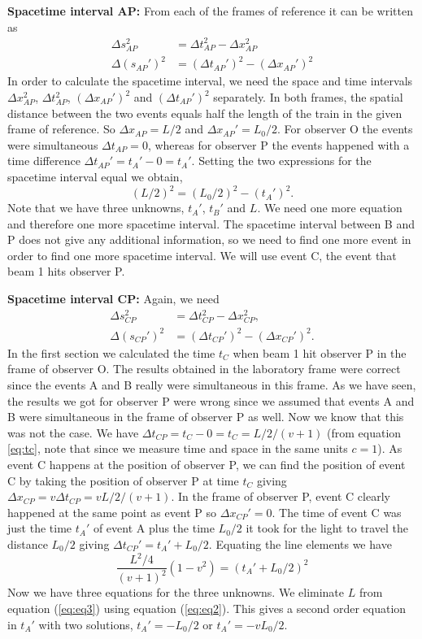 {\begin{multicols}{2}
{\bf Spacetime interval AP:}
From each of the frames of reference it can be written as
\begin{align*}
\Delta s_{AP}^2&=\Delta t_{AP}^2-\Delta x_{AP}^2\\
\Delta (s_{AP}')^2&=(\Delta t_{AP}')^2-(\Delta x_{AP}')^2
\end{align*}
In order to calculate the spacetime interval, we need the space and time intervals $\Delta x_{AP}^2$, $\Delta t_{AP}^2$, $(\Delta x_{AP}')^2$ and $(\Delta t_{AP}')^2$ separately. In both frames, the spatial distance between the two events equals half the length of the train in the given frame of reference. So $\Delta x_{AP}=L/2$ and $\Delta x_{AP}'=L_0/2$. For observer O the events were simultaneous $\Delta t_{AP}=0$, whereas for observer P the events happened with a time difference $\Delta t_{AP}'=t_A'-0=t_A'$. Setting the two expressions for the spacetime interval equal we obtain,
\begin{equation}
\label{eq:eq2}
(L/2)^2=(L_0/2)^2-(t_A')^2.
\end{equation}
Note that we have three unknowns, $t_A'$, $t_B'$ and $L$. We need one more equation and therefore one more spacetime interval. The spacetime interval between B and P does not give any additional information, so we need to find one more event in order to find one more spacetime interval. We will use event C, the event that beam 1 hits observer P.


{\bf Spacetime interval CP:}
Again, we need
\begin{align*}
\Delta s_{CP}^2&=\Delta t_{CP}^2-\Delta x_{CP}^2,\\
\Delta (s_{CP}')^2&=(\Delta t_{CP}')^2-(\Delta x_{CP}')^2.
\end{align*}
In the first section we calculated the time $t_C$  when beam 1 hit observer P in the frame of observer O. The results obtained in the laboratory frame were correct since the events A and B really were simultaneous in this frame. As we have seen, the results we got for observer P were wrong since we assumed that events A and B were simultaneous in the frame of observer P as well. Now we know that this was not the case. We have $\Delta t_{CP}=t_C-0=t_C=L/2/(v+1)$ (from equation \ref{eq:tc}, note that since we measure time and space in the same units $c=1$). As event C happens at the position of observer P, we can find the position of event C by taking the position of observer P at time $t_C$ giving $\Delta x_{CP}=v\Delta t_{CP}=vL/2/(v+1)$. In the frame of observer P, event C clearly happened at the same point as event P so $\Delta x_{CP}'=0$. The time of event C was just the time $t_A'$ of event A plus the time $L_0/2$ it took for the light to travel the distance $L_0/2$ giving $\Delta t_{CP}'=t_A'+L_0/2$. Equating the line elements we have
\begin{equation}
\label{eq:eq3}
\frac{L^2/4}{(v+1)^2}(1-v^2)=(t_A'+L_0/2)^2
\end{equation}
Now we have three equations for the three unknowns. We eliminate $L$ from equation (\ref{eq:eq3}) using equation (\ref{eq:eq2}). This gives a second order equation in $t_A'$ with two solutions, $t_A'=-L_0/2$ or $t_A'=-vL_0/2$. 


\end{multicols}}
